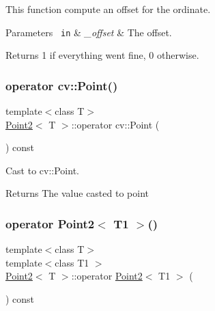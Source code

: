 This function compute an offset for the ordinate. 


\begin{DoxyParams}[1]{Parameters}
\mbox{\texttt{ in}}  & {\em \+\_\+offset} & The offset. \\
\hline
\end{DoxyParams}
\begin{DoxyReturn}{Returns}
1 if everything went fine, 0 otherwise. 
\end{DoxyReturn}
\mbox{\label{class_point2_a0d3f17f7d86d02eae126aa329a20861a}} 
\subsubsection{\texorpdfstring{operator cv::Point()}{operator cv::Point()}}
{\footnotesize\ttfamily template$<$class T$>$ \\
\mbox{\hyperlink{class_point2}{Point2}}$<$ T $>$\+::operator cv\+::\+Point (\begin{DoxyParamCaption}{ }\end{DoxyParamCaption}) const\hspace{0.3cm}{\ttfamily [inline]}}



Cast to cv\+::\+Point. 

\begin{DoxyReturn}{Returns}
The value casted to point 
\end{DoxyReturn}
\mbox{\label{class_point2_a3af3e22d9650f7bde9dd9deeb043dffa}} 
\subsubsection{\texorpdfstring{operator Point2$<$ T1 $>$()}{operator Point2< T1 >()}}
{\footnotesize\ttfamily template$<$class T$>$ \\
template$<$class T1 $>$ \\
\mbox{\hyperlink{class_point2}{Point2}}$<$ T $>$\+::operator \mbox{\hyperlink{class_point2}{Point2}}$<$ T1 $>$ (\begin{DoxyParamCaption}{ }\end{DoxyParamCaption}) const\hspace{0.3cm}{\ttfamily [inline]}}



